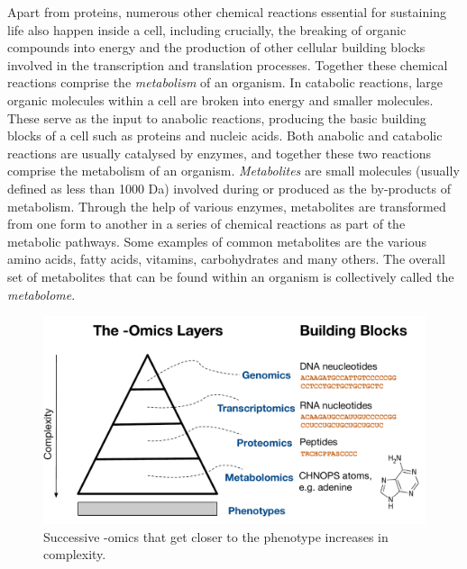 Apart from proteins, numerous other chemical reactions essential for sustaining life also happen inside a cell, including crucially, the breaking of organic compounds into energy and the production of other cellular building blocks involved in the transcription and translation processes. Together these chemical reactions comprise the \emph{metabolism} of an organism. In catabolic reactions, large organic molecules within a cell are broken into energy and smaller molecules. These serve as the input to anabolic reactions, producing the basic building blocks of a cell such as proteins and nucleic acids. Both anabolic and catabolic reactions are usually catalysed by enzymes, and together these two reactions comprise the metabolism of an organism. \emph{Metabolites} are small molecules (usually defined as less than 1000 Da) involved during or produced as the by-products of metabolism. Through the help of various enzymes, metabolites are transformed from one form to another in a series of chemical reactions as part of the metabolic pathways. Some examples of common metabolites are the various amino acids, fatty acids, vitamins, carbohydrates and many others. The overall set of metabolites that can be found within an organism is collectively called the \emph{metabolome}. 


\begin{figure}
\noindent \begin{centering}
\includegraphics[width=1.0\textwidth]{02-background/figures/omics}
\par\end{centering}
\caption{\label{fig:omics-triangle}Successive -omics that get closer to the phenotype increases in complexity.}
\end{figure}

